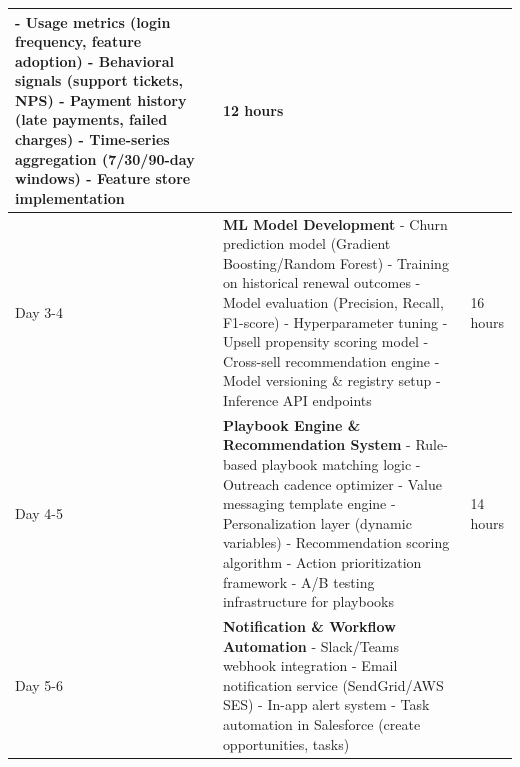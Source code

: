 \documentclass[12pt,a4paper]{article}
\begin{document}
\begin{longtable}{|p{2cm}|p{10cm}|p{2cm}|}
\hspace*{0.5cm} - Usage metrics (login frequency, feature adoption) \newline
\hspace*{0.5cm} - Behavioral signals (support tickets, NPS) \newline
\hspace*{0.5cm} - Payment history (late payments, failed charges) \newline
\hspace*{0.5cm} - Time-series aggregation (7/30/90-day windows) \newline
- Feature store implementation & 12 hours \\
\hline
Day 3-4 & \textbf{ML Model Development} \newline
- Churn prediction model (Gradient Boosting/Random Forest) \newline
- Training on historical renewal outcomes \newline
- Model evaluation (Precision, Recall, F1-score) \newline
- Hyperparameter tuning \newline
- Upsell propensity scoring model \newline
- Cross-sell recommendation engine \newline
- Model versioning \& registry setup \newline
- Inference API endpoints & 16 hours \\
\hline
Day 4-5 & \textbf{Playbook Engine \& Recommendation System} \newline
- Rule-based playbook matching logic \newline
- Outreach cadence optimizer \newline
- Value messaging template engine \newline
- Personalization layer (dynamic variables) \newline
- Recommendation scoring algorithm \newline
- Action prioritization framework \newline
- A/B testing infrastructure for playbooks & 14 hours \\
\hline
Day 5-6 & \textbf{Notification \& Workflow Automation} \newline
- Slack/Teams webhook integration \newline
- Email notification service (SendGrid/AWS SES) \newline
- In-app alert system \newline
- Task automation in Salesforce (create opportunities, tasks) \newline

\end{longtable}
\end{document}
